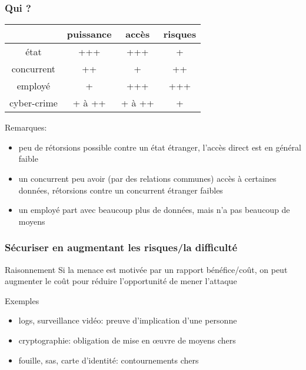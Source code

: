 \begin{reveals}
\begin{frame}
\end{frame}

\begin{frame}
  \frametitle{Qui ?}

\vfill
\begin{center}
  \begin{tabular}{|c|c|c|c|}
    \hline
    & puissance & accès & risques \\\hline
    état & +++ & +++ & + \\\hline
    concurrent & ++ & + & ++ \\\hline
    employé & + & +++ & +++ \\\hline
    cyber-crime& + à ++& + à ++ & +\\\hline
  \end{tabular}
\end{center}

\vfill
\begin{block}{Remarques:}
  \begin{itemize}
  \item peu de rétorsions possible contre un état étranger, l'accès
    direct est en général faible
  \item un concurrent peu avoir (par des relations communes) accès à
    certaines données, rétorsions contre un concurrent étranger faibles
  \item un employé part avec beaucoup plus de données, mais n'a pas
    beaucoup de moyens
  \end{itemize}
\end{block}
\vfill
\end{frame}

\begin{frame}
  \frametitle{Sécuriser en augmentant les risques/la difficulté}

  \vfill

  \begin{block}{Raisonnement}
    Si la menace est motivée par un rapport bénéfice/coût, on peut 
    augmenter le coût pour réduire l'opportunité de mener l'attaque
  \end{block}

  \vfill

  \begin{block}{Exemples}
    \begin{itemize}
    \item logs, surveillance vidéo: preuve d'implication d'une personne
    \item cryptographie: obligation de mise en \oe uvre de moyens chers
    \item fouille, sas, carte d'identité: contournements chers
    \end{itemize}
  \end{block}


\end{frame}
\end{reveals}
